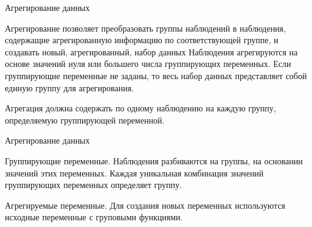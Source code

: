 \documentclass{beamer}
\begin{document}




  










\begin{frame}{Агрегирование данных} 

Агрегирование  позволяет преобразовать группы наблюдений в наблюдения,
 содержащие агрегированную информацию по соответствующей группе, 
 и создавать новый, агрегированный, набор  данных Наблюдения агрегируются 
 на основе значений нуля или большего числа группирующих переменных. 
 Если группирующие переменные не заданы, то весь набор данных представляет 
 собой единую группу для агрегирования.

 Агрегация должна  содержать по одному наблюдению на каждую группу, определяемую группирующей переменной. 

\end{frame}



\begin{frame}{Агрегирование данных} 

Группирующие переменные. Наблюдения разбиваются на группы, на основании значений этих переменных. Каждая уникальная комбинация значений группирующих переменных определяет группу. 

Агрегируемые переменные. Для создания новых переменных используются исходные переменные с груповыми функциями.  



\end{frame}



\end{document}
